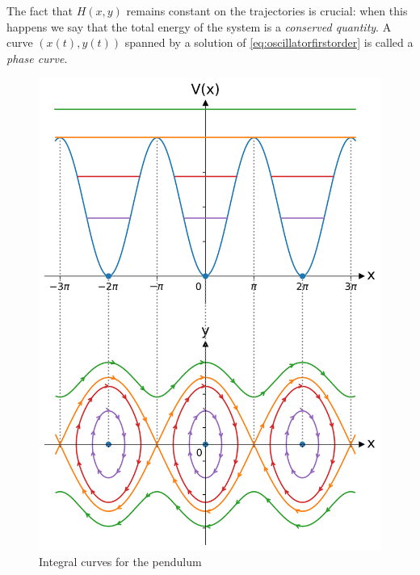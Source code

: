 \documentclass[english,fontsize=11pt,paper=b5]{scrbook}
\theoremstyle{definition}
\begin{document}
    The fact that $H(x,y)$ remains constant on the trajectories is crucial: when this happens we say that the total energy of the system is a \emph{conserved quantity}.
    A curve $(x(t), y(t))$ spanned by a solution of \eqref{eq:oscillatorfirstorder} is called a \emph{phase curve}.

    \begin{figure}[htbp]
      \centering
      \includegraphics[width=.7\linewidth]{images/potential-curves-pendulum.pdf}
      \caption{Integral curves for the pendulum}
      \label{fig:pendulum}
    \end{figure}
\end{document}
